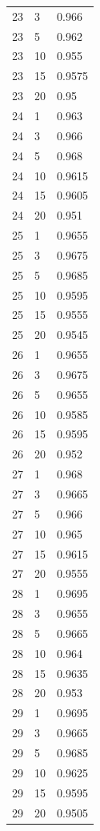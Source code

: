 \documentclass[runningheads]{llncs}
\begin{document}
\begin{longtable}{| p{} | p{} | p{} |}
23 & 3 & 0.966 \\
23 & 5 & 0.962 \\
23 & 10 & 0.955 \\
23 & 15 & 0.9575 \\
23 & 20 & 0.95 \\
24 & 1 & 0.963 \\
24 & 3 & 0.966 \\
24 & 5 & 0.968 \\
24 & 10 & 0.9615 \\
24 & 15 & 0.9605 \\
24 & 20 & 0.951 \\
25 & 1 & 0.9655 \\
25 & 3 & 0.9675 \\
25 & 5 & 0.9685 \\
25 & 10 & 0.9595 \\
25 & 15 & 0.9555 \\
25 & 20 & 0.9545 \\
26 & 1 & 0.9655 \\
26 & 3 & 0.9675 \\
26 & 5 & 0.9655 \\
26 & 10 & 0.9585 \\
26 & 15 & 0.9595 \\
26 & 20 & 0.952 \\
27 & 1 & 0.968 \\
27 & 3 & 0.9665 \\
27 & 5 & 0.966 \\
27 & 10 & 0.965 \\
27 & 15 & 0.9615 \\
27 & 20 & 0.9555 \\
28 & 1 & 0.9695 \\
28 & 3 & 0.9655 \\
28 & 5 & 0.9665 \\
28 & 10 & 0.964 \\
28 & 15 & 0.9635 \\
28 & 20 & 0.953 \\
29 & 1 & 0.9695 \\
29 & 3 & 0.9665 \\
29 & 5 & 0.9685 \\
29 & 10 & 0.9625 \\
29 & 15 & 0.9595 \\
29 & 20 & 0.9505 \\
\hline
\end{longtable}
\end{document}
